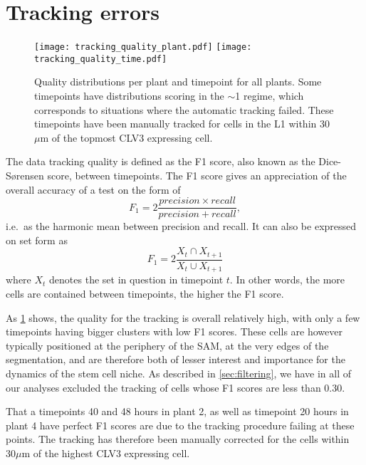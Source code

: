 \section{Tracking errors}
\label{sec:data_errors}
\begin{figure}[p]
    \centering
        \centering
        \texttt{[image: tracking\_quality\_plant.pdf]}
        \centering
        \texttt{[image: tracking\_quality\_time.pdf]} %
        \caption[Tracking quality]{Quality distributions per plant and timepoint for all plants.
        Some timepoints have distributions scoring in the $\sim$1 regime, which
        corresponds to situations where the automatic tracking failed. These
        timepoints have been manually tracked for cells in the L1 within 30
        $\mu$m of the topmost CLV3 expressing cell.}
      \label{fig:tracking_quality}
\end{figure}
The data tracking quality is defined as the F1 score, also known as the
Dice-S{\o}rensen score, between timepoints. The
F1 score gives an appreciation of the overall accuracy of a test on the form of
\begin{equation}
  F_1 = 2 \frac{precision\times recall}{precision + recall},
  \label{eq:f1}
\end{equation}
i.e.\ as the harmonic mean between precision and recall. It can also be
expressed on set form as 
\begin{equation}
  F_1 = 2 \frac{X_t \cap X_{t+1}}{X_t \cup X_{t+1}}
  \label{eq:f1_set}
\end{equation}
where $X_t$ denotes the set in question in timepoint $t$. In other words, the more cells are
contained between timepoints, the higher the F1 score.

As \cref{fig:tracking_quality} shows, the quality for the tracking is overall
relatively high, with only a few timepoints having bigger clusters with low F1
scores. These cells are however typically positioned at the periphery of the
SAM, at the very edges of the segmentation, and are therefore both of lesser
interest and importance for the dynamics of the stem cell niche. As described in
\cref{sec:filtering}, we have in all of our analyses excluded the tracking of
cells whose F1 scores are less than $0.30$. 

That a timepoints 40 and 48 hours in plant 2, as well as timepoint 20 hours in
plant 4 have perfect F1 scores are due to the tracking procedure failing at
these points. The tracking has therefore been manually corrected for the cells
within $30\mu$m of the highest CLV3 expressing cell.


